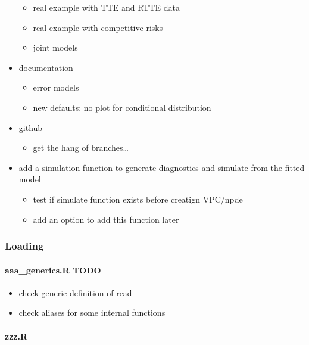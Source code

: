 \documentclass[
]{article}
\providecommand{\tightlist}{%
  \setlength{\itemsep}{0pt}\setlength{\parskip}{0pt}}
\begin{document}
\begin{itemize}
  \begin{itemize}
  \tightlist
  \item
    real example with TTE and RTTE data
  \item
    real example with competitive risks
  \item
    joint models
  \end{itemize}
\item
  documentation

  \begin{itemize}
  \tightlist
  \item
    error models
  \item
    new defaults: no plot for conditional distribution
  \end{itemize}
\item
  github

  \begin{itemize}
  \tightlist
  \item
    get the hang of branches\ldots{}
  \end{itemize}
\item
  add a simulation function to generate diagnostics and simulate from
  the fitted model

  \begin{itemize}
  \tightlist
  \item
    test if simulate function exists before creatign VPC/npde
  \item
    add an option to add this function later
  \end{itemize}
\end{itemize}

\hypertarget{loading}{%
\subsubsection{Loading}\label{loading}}

\hypertarget{aaa_generics.r-todo}{%
\paragraph{aaa\_generics.R TODO}\label{aaa_generics.r-todo}}

\begin{itemize}
\tightlist
\item
  check generic definition of read
\item
  check aliases for some internal functions
\end{itemize}

\hypertarget{zzz.r}{%
\paragraph{zzz.R}\label{zzz.r}}
\end{document}
